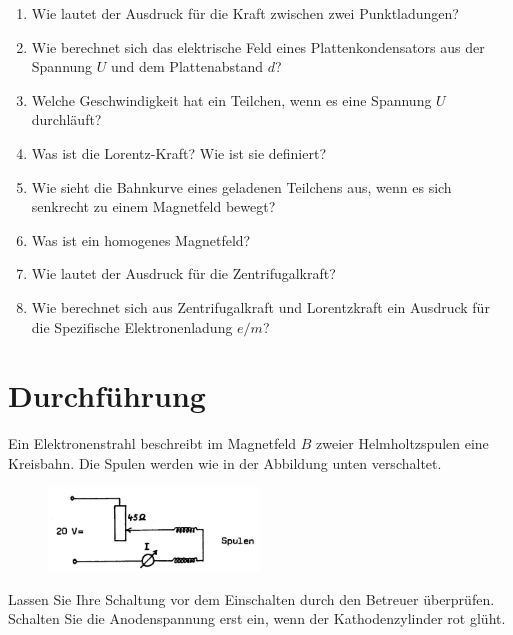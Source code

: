 \begin{enumerate}
	\item Wie lautet der Ausdruck für die Kraft zwischen zwei Punktladungen?
	\item Wie berechnet sich das elektrische Feld eines Plattenkondensators aus der Spannung $U$ und dem Plattenabstand $d$?
	\item Welche Geschwindigkeit hat ein Teilchen, wenn es eine Spannung $U$ durchläuft?
	\item Was ist die Lorentz-Kraft? Wie ist sie definiert?
	\item Wie sieht die Bahnkurve eines geladenen Teilchens aus, wenn es sich senkrecht zu einem Magnetfeld bewegt?
	\item Was ist ein homogenes Magnetfeld?
	\item Wie lautet der Ausdruck für die Zentrifugalkraft?
	\item Wie berechnet sich aus Zentrifugalkraft und Lorentzkraft ein Ausdruck für die Spezifische Elektronenladung $e/m$?
\end{enumerate}

\section{Durchführung} 

Ein Elektronenstrahl beschreibt im Magnetfeld $B$ zweier Helmholtzspulen eine Kreisbahn. Die Spulen werden wie in der Abbildung unten verschaltet.

\begin{figure}[h]
	\centering
		\includegraphics[width=0.50\textwidth]{Abbildungen/Schaltung-HHSpulen.jpg}
	\label{fig:Schaltung-HHSpulen}
\end{figure}

\begin{hint}
Lassen Sie Ihre Schaltung vor dem Einschalten durch den Betreuer überprüfen. Schalten Sie die Anodenspannung erst ein, wenn der Kathodenzylinder rot glüht.
\end{hint}

